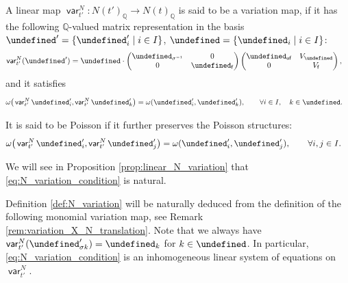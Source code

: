\documentclass[10pt,a4paper]{amsart}
\newcommand{\Q}{\mathbb{Q}}
\newcommand{\opname}[1]{\operatorname{\mathsf{#1}}}
\newcommand{\var}{\opname{var}}
\newcommand{\fv}{\opname{f}}
\newcommand{\ufv}{\opname{uf}}
\let\Iufv\undefined
\let\Id\undefined
\let\trans\undefined
\let\ee\undefined
\let\uee\undefined
\let\high\undefined
\newcommand{\Iufv}{I_{\ufv}}
\newcommand{\Id}{{\opname{Id}}}
\newcommand{\trans}{\opname{P}}
\newcommand{\ee}{\mathbf{e}}
\newcommand{\uee}{\underline{\ee}}
\newcommand{\high}{\opname{\ufv,\fv}}
\numberwithin{equation}{section}
\begin{document}
\begin{Definition}\label{def:N_variation}

A linear map $\var_{t'}^{N}\colon N(t')_{\Q}\rightarrow N(t)_{\Q}$ is said
to be a variation map, if it has the following $\Q$-valued matrix
representation in the basis $\uee'=\{\ee'_{i}\mid i\in I\}$, $\uee=\{\ee_{i}\mid i\in I\}$:
\begin{align}
\var_{t'}^{N}(\uee') & =\uee\cdot\begin{pmatrix}
\trans_{\sigma^{-1}} & 0\\
0 & \Id_{\fv}
\end{pmatrix}\begin{pmatrix}
\Id_{\ufv} & V_{\high}\\
0 & V_{\fv}
\end{pmatrix},\label{eq:N_variation_triangular}
\end{align}
and it satisfies
\begin{align}\label{eq:N_variation_condition}
\omega\big(\var_{t'}^{N}\ee'_{i},\var_{t'}^{N}\ee'_{k}\big) & =\omega(\ee'_{i},\ee'_{k}),\qquad \forall i\in I,\quad k\in\Iufv.
\end{align}

It is said to be Poisson if it further preserves the Poisson structures:
\begin{align*}
\omega\big(\var_{t'}^{N}\ee'_{i},\var_{t'}^{N}\ee'_{j}\big) & =\omega(\ee_{i}',\ee_{j}'),\qquad \forall i,j\in I.%
\end{align*}

\end{Definition}
We will see in Proposition \ref{prop:linear_N_variation} that
\eqref{eq:N_variation_condition} is natural.

Definition \ref{def:N_variation} will be naturally deduced from the definition of the following monomial variation map, see Remark \ref{rem:variation_X_N_translation}.
Note that we always have $\var_{t'}^{N}(\ee'_{\sigma k})=\ee_{k}$
for $k\in\Iufv$. In particular, \eqref{eq:N_variation_condition}
is an inhomogeneous linear system of equations on $\var_{t'}^{N}$.
\end{document}
